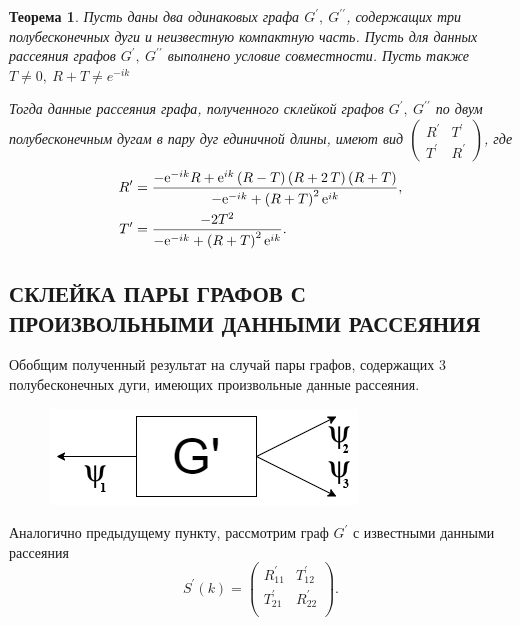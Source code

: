 \documentclass[a4 paper, 12 pt]{extarticle}
\newtheorem{theorem}{Теорема}[section]
\begin{document}
   \begin{theorem}
   	Пусть даны два одинаковых графа $G^\prime, \ G^{\prime\prime}$, содержащих три полубесконечных дуги и неизвестную компактную часть. Пусть для данных рассеяния графов  $G^\prime, \ G^{\prime\prime}$ выполнено условие совместности. Пусть также $T \neq 0, \ R+T \neq e^{-ik}$
   	
   	Тогда данные рассеяния графа, полученного склейкой графов $G^\prime, \ G^{\prime\prime}$ по двум полубесконечным дугам в пару дуг единичной длины, имеют вид $\left(\begin{matrix}
   	R^\prime & T^\prime \\
   	T^\prime & R^\prime
   	\end{matrix}\right)$, где
   	\[
   	\begin{aligned}
   	R^\prime &= {\frac {-{{\rm e}^{-ik}}R+{{\rm e}^{ik}} \left( R-T \right)  \left( R+
		2\,T \right)  \left( R+T \right) }{-{{\rm e}^{-ik}}+ \left(R+T\right)^2 {{\rm e}^{ik}}}}, \\
    T^\prime &= {\frac {-2{T}^{2}}{-{{\rm e}^{-ik}}+ \left(R+T\right)^2 {{\rm e}^{ik}}}}.
   	\end{aligned}\]
   \end{theorem}

   \subsection{СКЛЕЙКА ПАРЫ ГРАФОВ С ПРОИЗВОЛЬНЫМИ ДАННЫМИ РАССЕЯНИЯ}
   
   Обобщим полученный результат на случай пары графов, содержащих 3 полубесконечных дуги, имеющих произвольные данные рассеяния.
   
   \begin{figure}[!htb]
   	\centering
   	\includegraphics[scale=0.5]{g_prime.png}
   \end{figure}
   
   Аналогично предыдущему пункту, рассмотрим граф $G^\prime$ с известными данными рассеяния 
   \[
      S^\prime(k)=\left(%
   \begin{array}{cc}
   R_{11}^\prime & T_{12}^\prime \\
   T_{21}^\prime & R_{22}^\prime \\
   \end{array}%
   \right).
   \]
   
\end{document}
